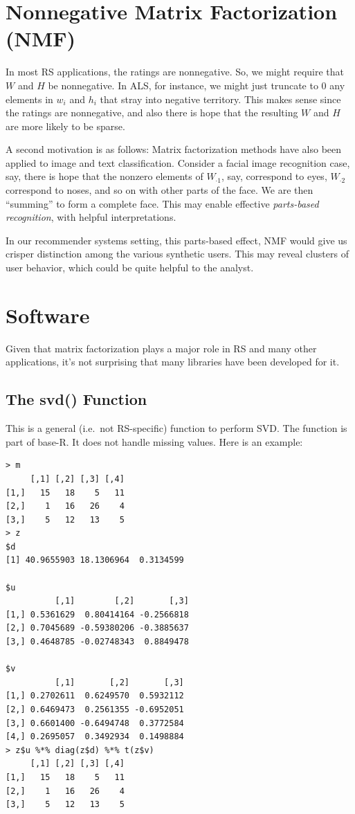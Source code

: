 \section{Nonnegative Matrix Factorization (NMF)}

In most RS applications, the ratings are nonnegative.  So, we might
require that $W$ and $H$ be nonnegative.  In ALS, for instance, we might
just truncate to 0 any elements in $w_i$ and $h_i$ that stray into
negative territory.  This makes sense since the ratings are nonnegative,
and also there is hope that the resulting $W$ and $H$ are more likely to
be sparse.

A second motivation is as follows:  Matrix factorization methods have
also been applied to image and text classification.  Consider 
a facial image recognition case, say, there is hope that 
the nonzero elements of $W_{\cdot 1}$, say, correspond to eyes, $W_{\cdot
2}$ correspond to noses, and so on with other parts of the face.  We are
then ``summing'' to form a complete face.  This may enable effective
{\it parts-based recognition}, with helpful interpretations.

In our recommender systems setting, this parts-based effect, NMF would
give us crisper distinction among the various synthetic users.  This may
reveal clusters of user behavior, which could be quite helpful to the
analyst.

\section{Software}

Given that matrix factorization plays a major role in RS and many other
applications, it's not surprising that many libraries have been
developed for it.

\subsection{The svd() Function}

This is a general (i.e.\ not RS-specific) function to perform SVD.  The
function is part of base-R.  It does not handle missing values.
Here is an example:

\begin{lstlisting}
> m
     [,1] [,2] [,3] [,4]
[1,]   15   18    5   11
[2,]    1   16   26    4
[3,]    5   12   13    5
> z
$d
[1] 40.9655903 18.1306964  0.3134599

$u
          [,1]        [,2]       [,3]
[1,] 0.5361629  0.80414164 -0.2566818
[2,] 0.7045689 -0.59380206 -0.3885637
[3,] 0.4648785 -0.02748343  0.8849478

$v
          [,1]       [,2]       [,3]
[1,] 0.2702611  0.6249570  0.5932112
[2,] 0.6469473  0.2561355 -0.6952051
[3,] 0.6601400 -0.6494748  0.3772584
[4,] 0.2695057  0.3492934  0.1498884
> z$u %*% diag(z$d) %*% t(z$v) 
     [,1] [,2] [,3] [,4]
[1,]   15   18    5   11
[2,]    1   16   26    4
[3,]    5   12   13    5
\end{lstlisting}

